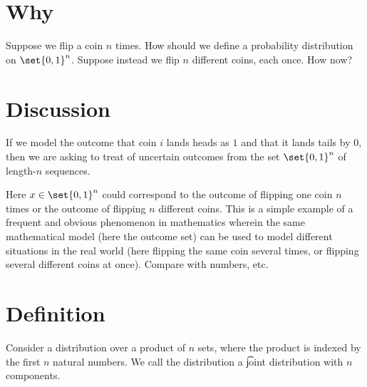 
\section*{Why}

Suppose we flip a coin $n$ times.
How should we define a probability distribution on $\set{0, 1}^n$.
Suppose instead we flip $n$ different coins, each once.
How now?

\section*{Discussion}

If we model the outcome that coin $i$ lands heads as $1$ and that it lands tails by $0$, then we are asking to treat of uncertain outcomes from the set $\set{0, 1}^n$ of length-$n$ sequences.

Here $x \in \set{0, 1}^n$ could correspond to the outcome of flipping one coin $n$ times or the outcome of flipping $n$ different coins.
This is a simple example of a frequent and obvious phenomenon in mathematics wherein the same mathematical model (here the outcome set) can be used to model different situations in the real world (here flipping the same coin several times, or flipping several different coins at once).
Compare with numbers, etc.

\section*{Definition}

Consider a distribution over a product of $n$ sets, where the product is indexed by the first $n$ natural numbers.
We call the distribution a \t{joint distribution} with $n$ components.

\blankpage